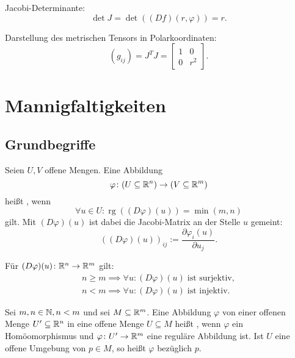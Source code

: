 Jacobi-Determinante:
\begin{equation}
\det J = \det((Df)(r,\varphi)) =r.
\end{equation}

\pagebreak[3]\noindent
Darstellung des metrischen Tensors in Polarkoordinaten:%
\begin{equation}
(g_{ij}) = J^T J = \begin{bmatrix}
1 & 0\\
0 & r^2
\end{bmatrix}.
\end{equation}

\section{Mannigfaltigkeiten}
\subsection{Grundbegriffe}

\begin{definition}
Seien $U,V$ offene Mengen. Eine Abbildung
\begin{equation}
\varphi\colon (U\subseteq\mathbb R^n)\to (V\subseteq\mathbb R^m)
\end{equation}
heißt , wenn
\begin{equation}
\forall u\in U\colon \operatorname{rg}((D\varphi)(u))=\min(m,n)
\end{equation}
gilt. Mit $(D\varphi)(u)$ ist dabei die Jacobi-Matrix an der Stelle
$u$ gemeint:
\begin{equation}
((D\varphi)(u))_{ij} := \frac{\partial\varphi_i(u)}{\partial u_j}.
\end{equation}
\end{definition}
\noindent
Für $(D\varphi)(u)\colon\mathbb R^n\to\mathbb R^m$ gilt:
\begin{gather}
n{\ge}m\implies\forall u\colon (D\varphi)(u)\;\text{ist surjektiv},\\
n{<}m\implies\forall u\colon (D\varphi)(u)\;\text{ist injektiv}.
\end{gather}

\begin{definition}
Sei $m,n\in\mathbb N, n<m$ und sei $M\subseteq\mathbb R^m$.
Eine Abbildung $\varphi$ von einer offenen Menge $U'\subseteq\mathbb R^n$
in eine offene Menge $U\subseteq M$ heißt ,
wenn $\varphi$ ein Homöomorphismus und $\varphi\colon U'\to\mathbb R^m$
eine reguläre Abbildung ist. Ist $U$ eine offene Umgebung von
$p\in M$, so heißt $\varphi$  bezüglich $p$.
\end{definition}
\pagebreak[1]

